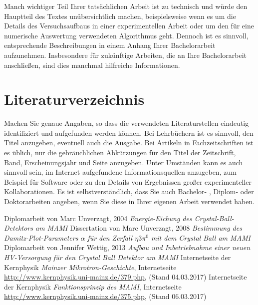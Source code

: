 \documentclass[a4paper,11pt,oneside,final,german,openbib,pdftex]{scrbook}
\begin{document}
{\begin{appendix}
Manch wichtiger Teil Ihrer tats\"achlichen Arbeit ist zu technisch 
und w\"urde den Hauptteil des Textes un\"ubersichtlich machen, 
beispielsweise wenn es um die Details des Versuchsaufbaus in einer 
experimentellen Arbeit oder um den f\"ur eine numerische Auswertung 
verwendeten Algorithmus geht. Dennoch ist es sinnvoll, entsprechende 
Beschreibungen in einem Anhang Ihrer Bachelorarbeit aufzunehmen. 
Insbesondere f\"ur zuk\"unftige Arbeiten, die an Ihre Bachelorarbeit 
anschlie{\ss}en, sind dies manchmal hilfreiche Informationen.

\chapter{Literaturverzeichnis}

Machen Sie genaue Angaben, so dass die verwendeten Literaturstellen 
eindeutig identifiziert und aufgefunden werden k\"onnen.
Bei Lehrb\"uchern \cite{Weinberg:1995mt} ist es sinnvoll, 
den Titel anzugeben, eventuell auch die Ausgabe. Bei Artikeln in 
Fachzeitschriften \cite{Moch:2001zr} ist es \"ublich, nur die 
gebr\"auchlichen Abk\"urzungen f\"ur den Titel der Zeitschrift, Band, 
Erscheinungsjahr und Seite anzugeben. Unter Umst\"anden kann es auch 
sinnvoll sein, im Internet aufgefundene Informationsquellen anzugeben, 
zum Beispiel f\"ur Software \cite{LoopTools} oder zu den Details von 
Ergebnissen gro{\ss}er experimenteller Kollaborationen. Es ist 
selbstverst\"andlich, dass Sie auch Bachelor- \cite{BA:Freund}, 
Diplom- oder Doktorarbeiten angeben, wenn Sie diese in Ihrer eigenen 
Arbeit verwendet haben.
\medskip



\renewcommand{\bibname}{\bfont Literaturverzeichnis} 

\begin{thebibliography}{99}
	
 Diplomarbeit von Marc Unverzagt, 2004 {\em Energie-Eichung des Crystal-Ball-Detektors am MAMI}
 Dissertation von Marc Unverzagt, 2008 {\em Bestimmung des Damitz-Plot-Parameters $\alpha$ für den Zerfall $ \eta 3\pi^{0} $ mit dem Crystal Ball am MAMI}
 Diplomarbeit von Jennifer Wettig, 2013 {\em Aufbau und Inbetriebnahme einer neuen HV-Versorgung für den Crystal Ball Detektor am MAMI}
 Internetseite der Kernphysik {\em Mainzer Mikrotron-Geschichte}, Internetseite \url{http://www.kernphysik.uni-mainz.de/379.php}, (Stand 04.03.2017)
 Internetseite der Kernphysik {\em Funktionsprinzip des MAMI}, Internetseite \url{http://www.kernphysik.uni-mainz.de/375.php}, (Stand 06.03.2017)


\end{thebibliography}
\end{appendix}}
\end{document}
